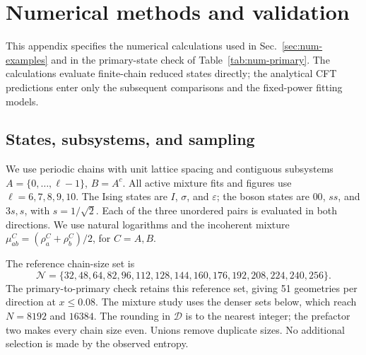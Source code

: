 \section{Numerical methods and validation}
\label{app:num-methods}
This appendix specifies the numerical calculations used in
Sec.~\ref{sec:num-examples} and in the primary-state check of
Table~\ref{tab:num-primary}. The calculations evaluate finite-chain
reduced states directly; the analytical CFT predictions enter only
the subsequent comparisons and the fixed-power fitting models.

\subsection{States, subsystems, and sampling}
\label{app:num-sampling}
We use periodic chains with unit lattice spacing and contiguous
subsystems $A=\{0,\ldots,\ell-1\}$, $B=A^c$. All active mixture
fits and figures use $\ell=6,7,8,9,10$. The Ising states are
$I$, $\sigma$, and $\varepsilon$; the boson states are
$00$, $ss$, and $3s,s$, with $s=1/\sqrt2$. Each of the three
unordered pairs is evaluated in both directions. We use natural
logarithms and the incoherent mixture
$\mu_{ab}^C=(\rho_a^C+\rho_b^C)/2$, for $C=A,B$.

The reference chain-size set is
\begin{equation}
 \mathcal N=\{32,48,64,82,96,112,128,144,160,176,192,208,224,240,256\}.
 \label{eq:num-reference-grid}
\end{equation}
The primary-to-primary check retains this reference set, giving
51 geometries per direction at $x\leq0.08$. The mixture study
uses the denser sets below, which reach $N=8192$ and $16384$.
The rounding in $\mathcal D$ is to the nearest integer; the
prefactor two makes every chain size even. Unions remove duplicate
sizes. No additional selection is made by the observed entropy.


